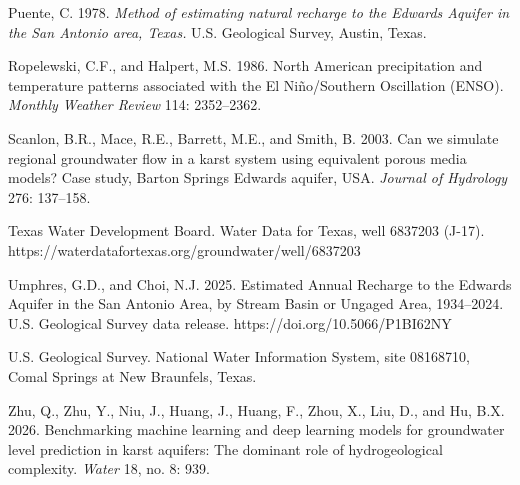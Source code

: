 \documentclass[11pt]{article}
\begin{document}
Puente, C. 1978. \emph{Method of estimating natural recharge to the
Edwards Aquifer in the San Antonio area, Texas.} U.S. Geological Survey,
Austin, Texas.

Ropelewski, C.F., and Halpert, M.S. 1986. North American precipitation
and temperature patterns associated with the El Niño/Southern
Oscillation (ENSO). \emph{Monthly Weather Review} 114: 2352--2362.

Scanlon, B.R., Mace, R.E., Barrett, M.E., and Smith, B. 2003. Can we
simulate regional groundwater flow in a karst system using equivalent
porous media models? Case study, Barton Springs Edwards aquifer, USA.
\emph{Journal of Hydrology} 276: 137--158.

Texas Water Development Board. Water Data for Texas, well 6837203
(J-17). https://waterdatafortexas.org/groundwater/well/6837203

Umphres, G.D., and Choi, N.J. 2025. Estimated Annual Recharge to the
Edwards Aquifer in the San Antonio Area, by Stream Basin or Ungaged
Area, 1934--2024. U.S. Geological Survey data release.
https://doi.org/10.5066/P1BI62NY

U.S. Geological Survey. National Water Information System, site
08168710, Comal Springs at New Braunfels, Texas.

Zhu, Q., Zhu, Y., Niu, J., Huang, J., Huang, F., Zhou, X., Liu, D., and
Hu, B.X. 2026. Benchmarking machine learning and deep learning models
for groundwater level prediction in karst aquifers: The dominant role of
hydrogeological complexity. \emph{Water} 18, no. 8: 939.
\end{document}

